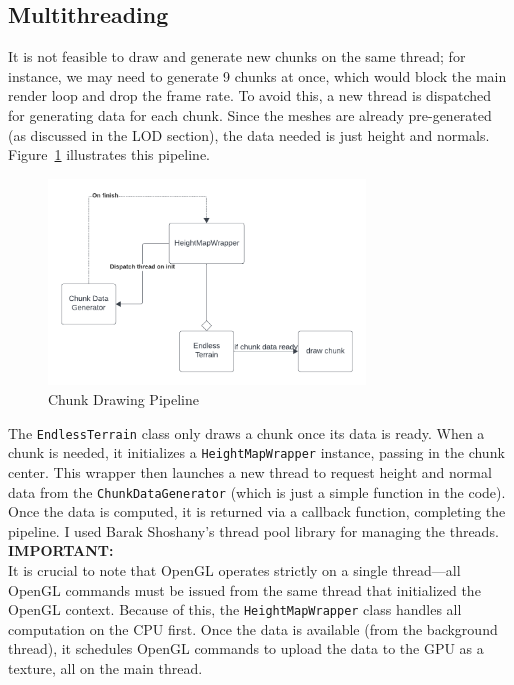 \subsection{Multithreading}
It is not feasible to draw and generate new chunks on the same thread; for instance, we may need to generate 9 chunks at once, which would block the main render loop and drop the frame rate. To avoid this, a new thread is dispatched for generating data for each chunk. Since the meshes are already pre-generated (as discussed in the LOD section), the data needed is just height and normals.
Figure~\ref{fig:chunk_pipeline} illustrates this pipeline.

\begin{figure}[H]
    \centering
    \includegraphics[width=0.75\textwidth]{images/chunk_process.png}
    \caption{Chunk Drawing Pipeline}
    \label{fig:chunk_pipeline}
\end{figure}

The \texttt{EndlessTerrain} class only draws a chunk once its data is ready. When a chunk is needed, it initializes a \texttt{HeightMapWrapper} instance, passing in the chunk center. This wrapper then launches a new thread to request height and normal data from the \texttt{ChunkDataGenerator} (which is just a simple function in the code). Once the data is computed, it is returned via a callback function, completing the pipeline. I used Barak Shoshany's thread pool library \cite{Shoshany2024} for managing the threads.
\\
\textbf{\large IMPORTANT:}\\
It is crucial to note that OpenGL operates strictly on a single thread—all OpenGL commands must be issued from the same thread that initialized the OpenGL context. Because of this, the \texttt{HeightMapWrapper} class handles all computation on the CPU first. Once the data is available (from the background thread), it schedules OpenGL commands to upload the data to the GPU as a texture, all on the main thread.

